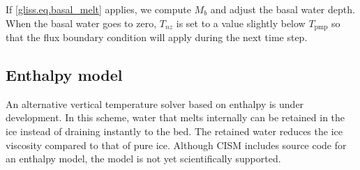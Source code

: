 If \eqref{gliss.eq.basal_melt} applies, we compute $M_b$ and adjust the basal water depth.
When the basal water goes to zero, $T_{nz}$ is set to a value slightly below $T_{\mathrm{pmp}}$
so that the flux boundary condition will apply during the next time step.

\subsection{Enthalpy model}

An alternative vertical temperature solver based on enthalpy is under development.
In this scheme, water that melts internally can be retained in the ice
instead of draining instantly to the bed. The retained water reduces the ice
viscosity compared to that of pure ice. Although CISM includes source code
for an enthalpy model, the model is not yet scientifically supported.


